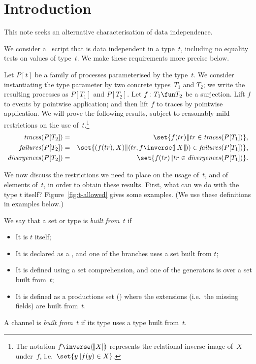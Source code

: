 \section{Introduction}

This note seeks an alternative characterisation of data independence.

We consider a \CSPm\ script that is data independent in a type~$t$, including
no equality tests on values of type~$t$.  We make these requirements more
precise below.

Let $P[t]$ be a family of processes parameterised by the type~$t$.  We
consider instantiating the type parameter by two concrete types~$T_1$ and
$T_2$; we write the resulting processes as $P[T_1]$ and $P[T_2]$.  Let $f: T_1
\fun T_2$ be a surjection.  Lift $f$ to events by pointwise application; and
then lift $f$ to traces by pointwise application.  We will prove the following
results, subject to reasonably mild restrictions on the use
of~$t$.\footnote{The notation $f\inverse \banana{X}$ represents the relational
inverse image of~$X$ under~$f$, i.e.~$\set{y \| f(y) \in X}$.}
%
\begin{eqnarray}
\traces(P[T_2]) & = & \set{f(tr) \| tr \in \traces(P[T_1])},
  \label{eqn:traces} \\
\failures(P[T_2]) & = &
  \set{(f(tr), X) \| (tr, f\inverse \banana{X}) \in \failures(P[T_1])},
  \label{eqn:failures} \\
\divergences(P[T_2]) & = & \set{f(tr) \| tr \in \divergences(P[T_1])}.
\end{eqnarray}


We now discuss the restrictions we need to place on the usage of~$t$, and of
elements of~$t$, in order to obtain these results.  First, what can we do with
the type $t$ itself?  Figure~\ref{fig:t-allowed} gives some examples.  (We use
these definitions in examples below.)
\framebox{\ldots} 

\begin{definition}
We say that a set or type is \emph{built from~$t$} if
%
\begin{itemize}
\item It is $t$ itself;

\item It is declared as a , and one of the branches uses a set
  built from $t$;

\item It is defined using a set comprehension, and one of the generators is
  over a set built from~$t$;

\item It is defined as a productions set () where the
extensions (i.e.~the missing fields)  are built from~$t$.
\end{itemize}
%
A channel is \emph{built from~$t$} if its type uses a type built from~$t$.
\end{definition}
 
